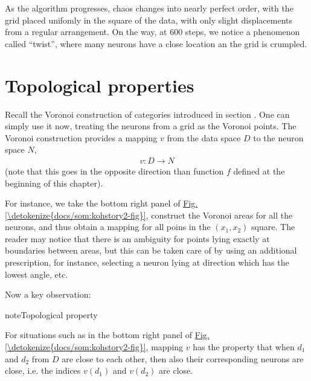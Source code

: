 \documentclass[letterpaper,10pt,english]{jupyterBook}
\begin{document}
\sphinxAtStartPar
As the algorithm progresses, chaos changes into nearly perfect order, with the grid placed unifomly in the square of the data, with only slight displacements from a regular arrangement. On the way, at 600 steps, we notice a phenomenon called “twist”, where many neurons have a close location an the grid is crumpled.


\section{Topological properties}
\label{\detokenize{docs/som:topological-properties}}
\sphinxAtStartPar
Recall the Voronoi construction of categories introduced in section {\hyperref[\detokenize{docs/unsupervised:vor-lab}]{}}. One can simply use it now, treating the neurons from a grid as the Voronoi points. The Voronoi construction provides a mapping \(v\) from the data space \(D\) to the neuron space \(N\),
\begin{equation*}
\begin{split} 
v: D \to N 
\end{split}
\end{equation*}
\sphinxAtStartPar
(note that this goes in the opposite direction than function \(f\) defined at the beginning of this chapter).

\sphinxAtStartPar
For instance, we take the bottom right panel of \hyperref[\detokenize{docs/som:kohstory2-fig}]{Fig.\@ \ref{\detokenize{docs/som:kohstory2-fig}}}, construct the Voronoi areas for all the neurons, and thus obtain a mapping for all poins in the \((x_1,x_2)\) square. The reader may notice that there is an ambiguity for points lying exactly at boundaries between areas, but this can be taken care of by using an additional prescription, for instance, selecting a neuron lying at direction which has the lowest angle, etc.

\sphinxAtStartPar
Now a key observation:

\begin{sphinxadmonition}{note}{Topological property}

\sphinxAtStartPar
For situations such as in the bottom right panel of \hyperref[\detokenize{docs/som:kohstory2-fig}]{Fig.\@ \ref{\detokenize{docs/som:kohstory2-fig}}}, mapping \(v\) has the property that when \(d_1\) and \(d_2\) from \(D\) are close to each other, then also their corresponding neurons are close, i.e. the indices \(v(d_1)\) and \(v(d_2)\) are close.
\end{sphinxadmonition}
\end{document}
